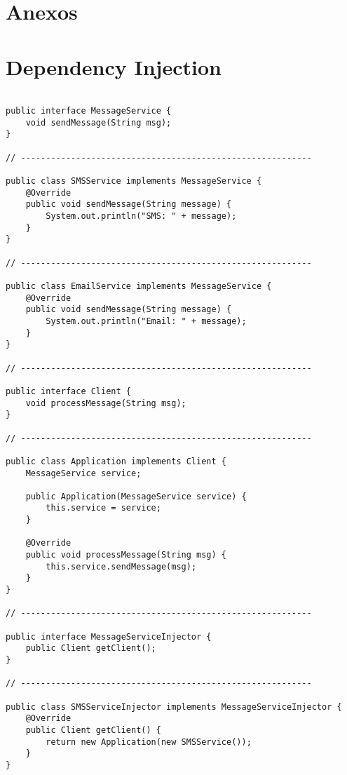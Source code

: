 \section{Anexos}
\label{sec:anexos}

\appendix

\section{Dependency Injection}
\label{anexo:dependency}

\begin{verbatim}

public interface MessageService {
    void sendMessage(String msg);
}

// ----------------------------------------------------------

public class SMSService implements MessageService {
    @Override
    public void sendMessage(String message) {
        System.out.println("SMS: " + message);
    }
}

// ----------------------------------------------------------

public class EmailService implements MessageService {
    @Override
    public void sendMessage(String message) {
        System.out.println("Email: " + message);
    }
}

// ----------------------------------------------------------

public interface Client {
    void processMessage(String msg);
}

// ----------------------------------------------------------

public class Application implements Client {
    MessageService service;

    public Application(MessageService service) {
        this.service = service;
    }

    @Override
    public void processMessage(String msg) {
        this.service.sendMessage(msg);
    }
}

// ----------------------------------------------------------

public interface MessageServiceInjector {
    public Client getClient();
}

// ----------------------------------------------------------

public class SMSServiceInjector implements MessageServiceInjector {
    @Override
    public Client getClient() {
        return new Application(new SMSService());
    }
}


\end{verbatim}
